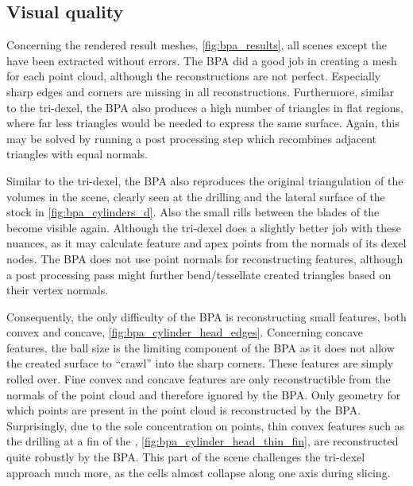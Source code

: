 \subsection{Visual quality}

Concerning the rendered result meshes, \cf \cref{fig:bpa_results}, all scenes except the \turbine have been extracted without errors.
The BPA did a good job in creating a mesh for each point cloud, although the reconstructions are not perfect.
Especially sharp edges and corners are missing in all reconstructions.
Furthermore, similar to the tri-dexel, the BPA also produces a high number of triangles in flat regions, where far less triangles would be needed to express the same surface.
Again, this may be solved by running a post processing step which recombines adjacent triangles with equal normals.

Similar to the tri-dexel, the BPA also reproduces the original triangulation of the volumes in the \cylindersd scene, clearly seen at the drilling and the lateral surface of the stock in \cref{fig:bpa_cylinders_d}.
Also the small rills between the blades of the \impeller become visible again.
Although the tri-dexel does a slightly better job with these nuances, as it may calculate feature and apex points from the normals of its dexel nodes.
The BPA does not use point normals for reconstructing features, although a post processing pass might \eg further bend/tessellate created triangles based on their vertex normals.

Consequently, the only difficulty of the BPA is reconstructing small features, both convex and concave, \cf \cref{fig:bpa_cylinder_head_edges}.
Concerning concave features, the ball size is the limiting component of the BPA as it does not allow the created surface to \enquote{crawl} into the sharp corners.
These features are simply rolled over.
Fine convex and concave features are only reconstructible from the normals of the point cloud and therefore ignored by the BPA.
Only geometry for which points are present in the point cloud is reconstructed by the BPA.
Surprisingly, due to the sole concentration on points, thin convex features such as the drilling at a fin of the \cylinderhead, \cf \cref{fig:bpa_cylinder_head_thin_fin}, are reconstructed quite robustly by the BPA.
This part of the scene challenges the tri-dexel approach much more, as the cells almost collapse along one axis during slicing.

